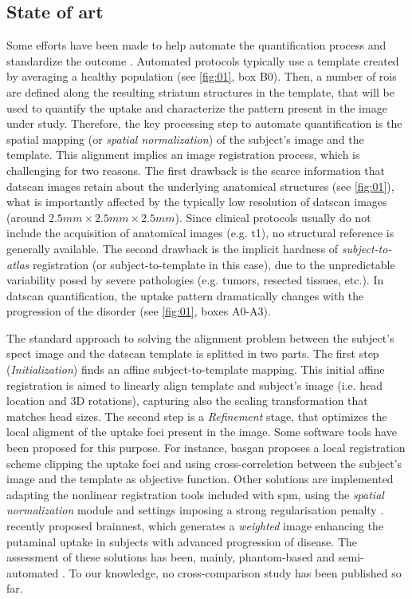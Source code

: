 \documentclass{frontiers}
\newcommand{\fixme}[1]{}
\newcommand{\fixme}[1]{{\color{red}{\bf FIXME: }\emph{#1}}}
\begin{document}
\subsection{State of art}\label{sec:state-of-art}
Some efforts have been made to help automate the quantification process 
  and standardize the outcome \citep{calvini_basal_2007,badiavas_spect_2011}.
Automated protocols typically use a template created by averaging a healthy
  population (see \autoref{fig:01}, box B0).
Then, a number of \glspl*{roi} are defined along the resulting striatum 
  structures in the template, that will be used to quantify the uptake and characterize the
  pattern present in the image under study.
Therefore, the key processing step to automate quantification is the
  spatial mapping (or \emph{spatial normalization}) of the subject's image and
  the template.
This alignment implies an image registration process, which is challenging for two reasons.
The first drawback is the scarce information that \gls*{datscan} images 
  retain about the underlying anatomical structures (see \autoref{fig:01}),
  what is importantly affected by the typically low resolution of
  \gls*{datscan} images (around $2.5mm\times2.5mm\times2.5mm$).
Since clinical protocols usually do not include the acquisition of anatomical images
  (e.g. \gls*{t1}), no structural reference is generally available.
The second drawback is the implicit hardness of \emph{subject-to-atlas} registration
  (or subject-to-template in this case), due to the unpredictable variability posed by
  severe pathologies (e.g. tumors, resected tissues, etc.).
In \gls*{datscan} quantification, the uptake pattern dramatically changes 
  with the progression of the disorder (see \autoref{fig:01}, boxes A0-A3).

The standard approach to solving the alignment problem between the subject's
  \gls*{spect} image and the \gls*{datscan} template is splitted in two parts.
The first step (\emph{Initialization}) finds an affine subject-to-template mapping.
This initial affine registration is aimed to linearly align template and subject's
  image (i.e. head location and 3D rotations), capturing also the scaling 
  transformation that matches head sizes.
The second step is a \emph{Refinement} stage, that optimizes the local aligment of
  the uptake foci present in the image.
Some software tools have been proposed for this purpose.
For instance, \gls*{basgan} proposes a local registration scheme clipping the 
  uptake foci and using cross-correletion between the subject's image and 
  the template as objective function.
Other solutions are implemented adapting the nonlinear registration tools included
  with \gls*{spm}, using the \emph{spatial normalization} module and settings
  imposing a strong regularisation penalty \fixme{reference needed}.
\citeauthor{ciarmiello_weighted_2013} recently proposed \gls*{brainnest}, which
  generates a \emph{weighted} image enhancing the putaminal uptake in
  subjects with advanced progression of disease.
The assessment of these solutions has been, mainly, phantom-based
  and semi-automated \citep{skanjeti_assessing_2013}.
To our knowledge, no cross-comparison study has been published so far.
\end{document}
